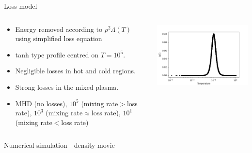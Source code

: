 \documentclass[10pt,aspectratio=169,usenames,dvipsnames]{beamer}
\begin{document}
\begin{frame}{Loss model}
\begin{columns}
\begin{column}{0.55\textwidth}
\begin{itemize}
    \item Energy removed according to $\rho^2 \Lambda (T)$ using simplified loss equation
    \item tanh type profile centred on $T=10^5$.
    \item Negligible losses in hot and cold regions.
    \item Strong losses in the mixed plasma.
    \item MHD (no losses), $10^5$ (mixing rate$>$loss rate), $10^3$ (mixing rate$\approx$loss rate), $10^1$ (mixing rate$<$loss rate)
\end{itemize}
\end{column}
\begin{column}{0.45\textwidth}
\includegraphics[width=0.95\linewidth]{2023Dundee/Figures/lossprof.png}
\end{column}
\end{columns}
\end{frame}

\begin{frame}{Numerical simulation - density movie}
\end{frame}
\end{document}
